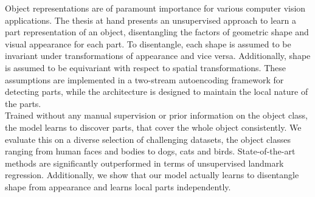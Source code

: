   Object representations are of paramount importance for various computer vision applications. %
  The thesis at hand presents an unsupervised approach to learn a part representation of an object, disentangling the factors of geometric shape and visual appearance for each part. %
  To disentangle, each shape is assumed to be invariant under transformations of appearance and vice versa. Additionally, shape is assumed to be equivariant with respect to spatial transformations. These assumptions are implemented in a two-stream autoencoding framework for detecting parts, while the architecture is designed to maintain the local nature of the parts.\\
  Trained without any manual supervision or prior information on the object class, the model learns to discover parts, that cover the whole object consistently. We evaluate this on a diverse selection of challenging datasets, the object classes ranging from human faces and bodies to dogs, cats and birds.
  State-of-the-art methods are significantly outperformed in terms of unsupervised landmark regression.
  Additionally, we show that our model actually learns to disentangle shape from appearance and learns local parts independently.



